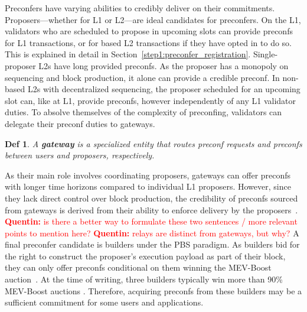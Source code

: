 \documentclass[a4paper]{article}
\theoremstyle{boldstyle}
\newtheorem*{definitionx}{Def}
\newenvironment{definition}
  {\begin{defopenboxq}\begin{definitionx}}
  {\end{definitionx}\end{defopenboxq}}
\newcommand{\qb}[1]{\textcolor{red}{\textbf{Quentin:} #1}}
\begin{document}
        Preconfers have varying abilities to credibly deliver on their commitments. Proposers—whether for L1 or L2—are ideal candidates for preconfers. 
        On the L1, validators who are scheduled to propose in upcoming slots can provide preconfs for L1 transactions, or for based L2 transactions if they have opted in to do so. This is explained in detail in Section~\ref{step1:preconfer_registration}. Single-proposer L2s have long provided preconfs. As the proposer has a monopoly on sequencing and block production, it alone can provide a credible preconf. 
        In non-based L2s with decentralized sequencing, the proposer scheduled for an upcoming slot can, like at L1, provide preconfs, however independently of any L1 validator duties. 
        To absolve themselves of the complexity of preconfing, validators can delegate their preconf duties to gateways.
        \begin{definition}
        A \textbf{gateway} is a specialized entity that routes preconf requests and preconfs between users and proposers, respectively.
        \end{definition}
        As their main role involves coordinating proposers, gateways can offer preconfs with longer time horizons compared to individual L1 proposers. However, since they lack direct control over block production, the credibility of preconfs sourced from gateways is derived from their ability to enforce delivery by the proposers~\cite{W:ThePreconfirmationGatewayUnlockingPreconfirmations:FromUsertoPreconfer, W:Ahead-of-TimeBlockAuctionsToEnableExecutionPreconfirmations,W:DelegationinBolt:OutsourcingSophisticationWhilePreservingDecentralization}. \qb{is there a better way to formulate these two sentences / more relevant points to mention here?}
        \qb{relays are distinct from gateways, but why?}
        A final preconfer candidate is builders under the PBS paradigm. As builders bid for the right to construct the proposer's execution payload as part of their block, they can only offer preconfs conditional on them winning the MEV-Boost auction~\cite{W:PreconfirmationFairExchange,W:LeaderlessandLeader-BasedPreconfirmations}. At the time of writing, three builders typically win more than 90\% MEV-Boost auctions \cite{MEV.pics}. Therefore, acquiring preconfs from these builders may be a sufficient commitment for some users and applications. 

\end{document}
